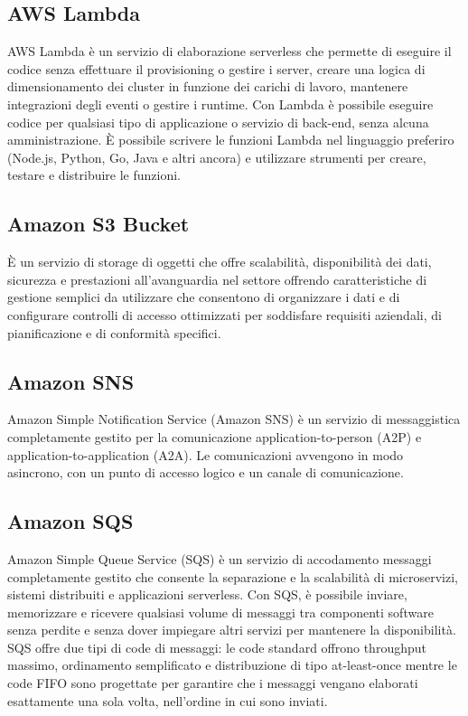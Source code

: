 \subsection{AWS Lambda}
AWS Lambda è un servizio di elaborazione serverless che permette di eseguire il codice senza effettuare il provisioning o gestire i server, creare una logica di dimensionamento dei cluster in funzione dei carichi di lavoro, mantenere integrazioni degli eventi o gestire i runtime. Con Lambda è possibile eseguire codice per qualsiasi tipo di applicazione o servizio di back-end, senza alcuna amministrazione.  È possibile scrivere le funzioni Lambda nel linguaggio preferiro (Node.js, Python, Go, Java e altri ancora) e utilizzare strumenti per creare, testare e distribuire le funzioni.

\subsection{Amazon S3 Bucket}
È un servizio di storage di oggetti che offre scalabilità, disponibilità dei dati, sicurezza e prestazioni all'avanguardia nel settore offrendo caratteristiche di gestione semplici da utilizzare che consentono di organizzare i dati e di configurare controlli di accesso ottimizzati per soddisfare requisiti aziendali, di pianificazione e di conformità specifici.
\subsection{Amazon SNS}
Amazon Simple Notification Service (Amazon SNS) è un servizio di messaggistica completamente gestito per la comunicazione application-to-person (A2P) e application-to-application (A2A).
Le comunicazioni avvengono in modo asincrono, con un punto di accesso logico e un canale di comunicazione. 
\subsection{Amazon SQS}
Amazon Simple Queue Service (SQS) è un servizio di accodamento messaggi completamente gestito che consente la separazione e la scalabilità di microservizi, sistemi distribuiti e applicazioni serverless. Con SQS, è possibile inviare, memorizzare e ricevere qualsiasi volume di messaggi tra componenti software senza perdite e senza dover impiegare altri servizi per mantenere la disponibilità. 
SQS offre due tipi di code di messaggi: le code standard offrono throughput massimo, ordinamento semplificato e distribuzione di tipo at-least-once mentre le code FIFO sono progettate per garantire che i messaggi vengano elaborati esattamente una sola volta, nell'ordine in cui sono inviati.
